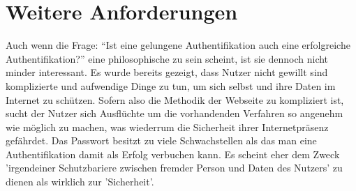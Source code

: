\section{Weitere Anforderungen}
Auch wenn die Frage: ``Ist eine gelungene Authentifikation auch eine erfolgreiche Authentifikation?'' eine philosophische zu sein scheint, ist sie dennoch nicht minder interessant. Es wurde bereits gezeigt, dass Nutzer nicht gewillt sind komplizierte und aufwendige Dinge zu tun, um sich selbst und ihre Daten im Internet zu schützen. Sofern also die Methodik der Webseite zu kompliziert ist, sucht der Nutzer sich Ausflüchte um die vorhandenden Verfahren so angenehm wie möglich zu machen, was wiederrum die Sicherheit ihrer Internetpräsenz gefährdet. Das Passwort besitzt zu viele Schwachstellen als das man eine Authentifikation damit als Erfolg verbuchen kann. Es scheint eher dem Zweck 'irgendeiner Schutzbariere zwischen fremder Person und Daten des Nutzers' zu dienen als wirklich zur 'Sicherheit'.


